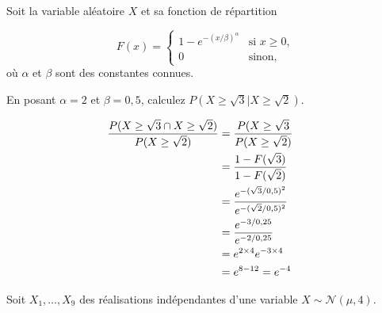 \begin{questions}
\newpage

\question[8] Soit la variable aléatoire $X$ et sa fonction de répartition

\[ F(x) =
\begin{cases}
   \displaystyle 1-e^{-(x/\beta)^\alpha}& \text{si } x \ge 0, \\
    0 & \text{sinon},
\end{cases}
\]
où $\alpha$ et $\beta$ sont des constantes connues.

En posant $\alpha = 2$ et $\beta=0,5$, calculez $P(X\geq \sqrt{3} | X\geq \sqrt{2})$.

\begin{solution}
    \begin{align*}
        \frac{P(X \geq \sqrt{3} \cap X \geq \sqrt{2})}{P(X \geq \sqrt{2})}
        &= \frac{P(X \geq \sqrt{3} }{P(X \geq \sqrt{2})} \cr
        &=\frac{1-F(\sqrt{3})}{1-F(\sqrt{2})} \cr
        &=\frac{e^{-(\sqrt{3}/0,5)^2}}{e^{-(\sqrt{2}/0,5)^2}}\cr
        &= \frac{e^{-3/0,25}}{e^{-2/0,25}} \cr
        &= e^{2 \times 4}e^{-3\times 4} \cr
        &= e^{8-12} = e^{-4}
    \end{align*}
\end{solution}



\newpage
\question\label{estimateursPonctuels} 
Soit $X_1,\hdots,X_9$ des réalisations indépendantes d'une variable $X\sim\mathcal{N}(\mu, 4)$. 

\end{questions}
